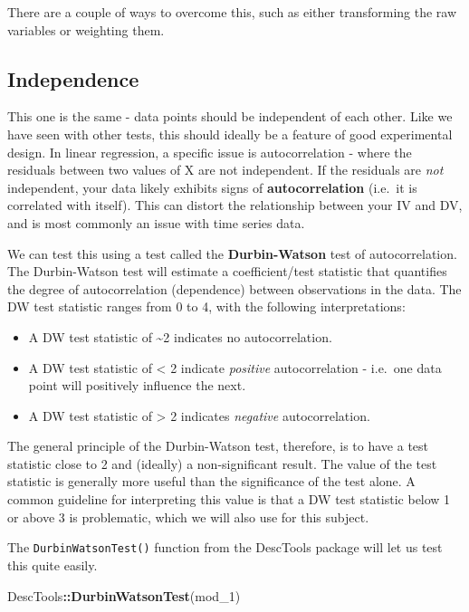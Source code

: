 \documentclass[
]{book}
\newenvironment{Shaded}{\begin{snugshade}}{\end{snugshade}}
\newcommand{\FunctionTok}[1]{\textcolor[rgb]{0.13,0.29,0.53}{\textbf{#1}}}
\newcommand{\NormalTok}[1]{#1}
\newcommand{\SpecialCharTok}[1]{\textcolor[rgb]{0.81,0.36,0.00}{\textbf{#1}}}
\providecommand{\tightlist}{%
  \setlength{\itemsep}{0pt}\setlength{\parskip}{0pt}}
\begin{document}
There are a couple of ways to overcome this, such as either transforming the raw variables or weighting them.

\subsection{Independence}\label{independence}

This one is the same - data points should be independent of each other. Like we have seen with other tests, this should ideally be a feature of good experimental design. In linear regression, a specific issue is autocorrelation - where the residuals between two values of X are not independent. If the residuals are \emph{not} independent, your data likely exhibits signs of \textbf{autocorrelation} (i.e.~it is correlated with itself). This can distort the relationship between your IV and DV, and is most commonly an issue with time series data.

We can test this using a test called the \textbf{Durbin-Watson} test of autocorrelation. The Durbin-Watson test will estimate a coefficient/test statistic that quantifies the degree of autocorrelation (dependence) between observations in the data. The DW test statistic ranges from 0 to 4, with the following interpretations:

\begin{itemize}
\tightlist
\item
  A DW test statistic of \textasciitilde2 indicates no autocorrelation.
\item
  A DW test statistic of \textless{} 2 indicate \emph{positive} autocorrelation - i.e.~one data point will positively influence the next.
\item
  A DW test statistic of \textgreater{} 2 indicates \emph{negative} autocorrelation.
\end{itemize}

The general principle of the Durbin-Watson test, therefore, is to have a test statistic close to 2 and (ideally) a non-significant result. The value of the test statistic is generally more useful than the significance of the test alone. A common guideline for interpreting this value is that a DW test statistic below 1 or above 3 is problematic, which we will also use for this subject.

The \texttt{DurbinWatsonTest()} function from the DescTools package will let us test this quite easily.

\begin{Shaded}
\begin{Highlighting}[]
\NormalTok{DescTools}\SpecialCharTok{::}\FunctionTok{DurbinWatsonTest}\NormalTok{(mod\_1)}
\end{Highlighting}
\end{Shaded}
\end{document}
